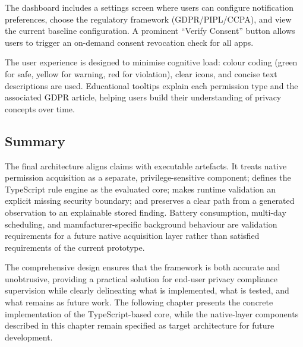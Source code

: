 The dashboard includes a settings screen where users can configure notification preferences, choose the regulatory framework (GDPR/PIPL/CCPA), and view the current baseline configuration. A prominent ``Verify Consent'' button allows users to trigger an on-demand consent revocation check for all apps.

The user experience is designed to minimise cognitive load: colour coding (green for safe, yellow for warning, red for violation), clear icons, and concise text descriptions are used. Educational tooltips explain each permission type and the associated GDPR article, helping users build their understanding of privacy concepts over time.

\subsection{Summary}

The final architecture aligns claims with executable artefacts. It treats native permission acquisition as a separate, privilege-sensitive component; defines the TypeScript rule engine as the evaluated core; makes runtime validation an explicit missing security boundary; and preserves a clear path from a generated observation to an explainable stored finding. Battery consumption, multi-day scheduling, and manufacturer-specific background behaviour are validation requirements for a future native acquisition layer rather than satisfied requirements of the current prototype.

The comprehensive design ensures that the framework is both accurate and unobtrusive, providing a practical solution for end-user privacy compliance supervision while clearly delineating what is implemented, what is tested, and what remains as future work. The following chapter presents the concrete implementation of the TypeScript-based core, while the native-layer components described in this chapter remain specified as target architecture for future development.
